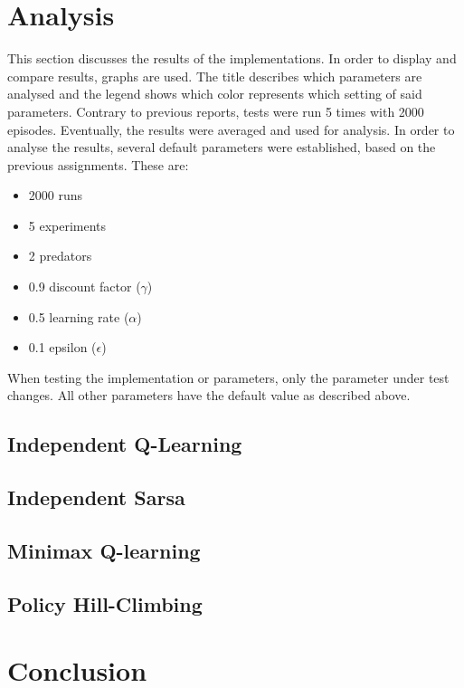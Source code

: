 \documentclass{article}
\begin{document}
\pagebreak


\section{Analysis}
This section discusses the results of the implementations. In order to display and compare results, graphs are used. The title describes which parameters are analysed and the legend shows which color represents which setting of said parameters. Contrary to previous reports, tests were run 5 times with 2000 episodes. Eventually, the results were averaged and used for analysis. In order to analyse the results, several default parameters were established, based on the previous assignments. These are:

\begin{itemize}
\item 2000 runs
\item 5 experiments
\item 2 predators
\item 0.9 discount factor ($\gamma$)
\item 0.5 learning rate ($\alpha$)
\item 0.1 epsilon ($\epsilon$)
\end{itemize}

When testing the implementation or parameters, only the parameter under test changes. All other parameters have the default value as described above.

\subsection{Independent Q-Learning}


\subsection{Independent Sarsa}


\subsection{Minimax Q-learning}

\subsection{Policy Hill-Climbing}

\pagebreak


\section{Conclusion}

\pagebreak
\end{document}
